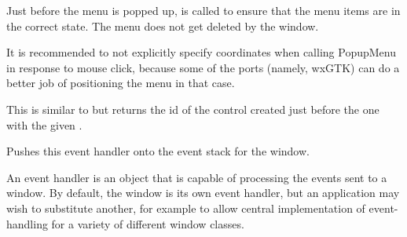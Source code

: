 







Just before the menu is popped up, 
is called to ensure that the menu items are in the correct state. The menu does
not get deleted by the window.

It is recommended to not explicitly specify coordinates when calling PopupMenu
in response to mouse click, because some of the ports (namely, wxGTK) can do
a better job of positioning the menu in that case.



\label{wxwindowprevcontrolid}


This is similar to  but returns
the id of the control created just before the one with the given .


\label{wxwindowpusheventhandler}


Pushes this event handler onto the event stack for the window.




An event handler is an object that is capable of processing the events
sent to a window. By default, the window is its own event handler, but
an application may wish to substitute another, for example to allow
central implementation of event-handling for a variety of different
window classes.

